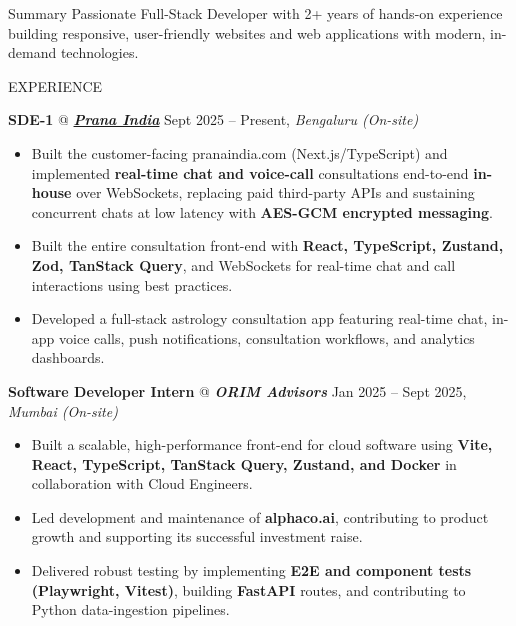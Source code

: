 \documentclass{resume} %
\makeatletter
\newcommand{\experience}[5]{
    \textbf{#1} @ \textit{\textbf{#2}} \hfill #3, \textit{#4}
    \vspace{-7pt}
    \begin{itemize}[leftmargin=*]
        \itemsep -7pt {}
        #5
    \end{itemize}
    \vspace{-4pt}
}
\makeatother
\begin{document}

\begin{rSection}{Summary}
\vspace{-4pt}
Passionate Full-Stack Developer with 2+ years of hands-on experience building responsive, user-friendly websites and web applications with modern, in-demand technologies.
\end{rSection}


\begin{rSection}{EXPERIENCE}

\experience{SDE-1}{\href{https://pranaindia.com}{Prana India}}{Sept 2025 -- Present}{Bengaluru (On-site)}{
    \item Built the customer-facing pranaindia.com (Next.js/TypeScript) and implemented \textbf{real-time chat and voice-call} consultations end-to-end \textbf{in-house} over WebSockets, replacing paid third-party APIs and sustaining concurrent chats at low latency with \textbf{AES-GCM encrypted messaging}. %
    \item Built the entire consultation front-end with \textbf{React, TypeScript, Zustand, Zod, TanStack Query}, and WebSockets for real-time chat and call interactions using best practices.
    \item Developed a full-stack astrology consultation app featuring real-time chat, in-app voice calls, push notifications, consultation workflows, and analytics dashboards.
}

\experience{Software Developer Intern}{ORIM Advisors}{Jan 2025 -- Sept 2025}{Mumbai (On-site)}{
    \item Built a scalable, high-performance front-end for cloud software using \textbf{Vite, React, TypeScript, TanStack Query, Zustand, and Docker} in collaboration with Cloud Engineers.
    \item Led development and maintenance of \textbf{alphaco.ai}, contributing to product growth and supporting its successful investment raise.
    \item Delivered robust testing by implementing \textbf{E2E and component tests (Playwright, Vitest)}, building \textbf{FastAPI} routes, and contributing to Python data-ingestion pipelines.
}


\end{rSection}
\end{document}
